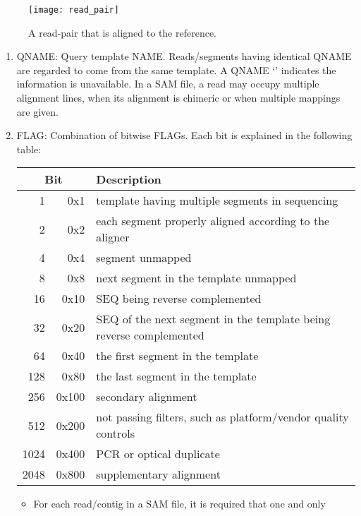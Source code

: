 \begin{figure}[H]
\texttt{[image: read\_pair]}
\centering
\caption {A read-pair that is aligned to the reference.}
\label{fig:read_pair}
\end{figure}

\begin{enumerate}
    \item {\sf QNAME}: Query template NAME. Reads/segments having identical {\sf QNAME} are regarded to come from the same template. A {\sf QNAME} `{\tt *}' indicates the information is unavailable.  In a SAM file, a read may occupy
        multiple alignment lines, when its alignment is chimeric or when multiple mappings are given.
    \item {\sf FLAG}: Combination of bitwise FLAGs. Each bit is explained in the following table:
      \begin{center}\small
      \begin{tabular}{rrl}
      \hline
      \multicolumn{2}{c}{Bit} & Description\\
      \hline
        1 &    0x1 & template having multiple segments in sequencing \\
        2 &    0x2 & each segment properly aligned according to the aligner \\
        4 &    0x4 & segment unmapped \\
        8 &    0x8 & next segment in the template unmapped \\
       16 &   0x10 & {\sf SEQ} being reverse complemented \\
       32 &   0x20 & {\sf SEQ} of the next segment in the template being reverse complemented \\
       64 &   0x40 & the first segment in the template \\
      128 &   0x80 & the last segment in the template \\
      256 &  0x100 & secondary alignment \\
      512 &  0x200 & not passing filters, such as platform/vendor quality controls \\
     1024 &  0x400 & PCR or optical duplicate \\
     2048 &  0x800 & supplementary alignment \\
      \hline
      \end{tabular}
      \end{center}
      \begin{itemize}
      \item For each read/contig in a SAM file, it is required that one and only

\end{itemize}
\end{enumerate}
